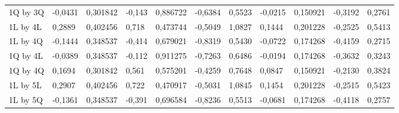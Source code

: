 \begin{table}[H]
{\begin{tabular}{lllllllllll}
\rowcolor[HTML]{FFFFFF} 
1Q by 3Q       & -0,0431                         & 0,301842                        & -0,143                          & 0,886722                        & -0,6384                         & 0,5523                          & -0,0215                         & 0,150921                        & -0,3192                         & 0,2761                          \\
\rowcolor[HTML]{FFFFFF} 
1L by 4L       & 0,2889                          & 0,402456                        & 0,718                           & 0,473744                        & -0,5049                         & 1,0827                          & 0,1444                          & 0,201228                        & -0,2525                         & 0,5413                          \\
\rowcolor[HTML]{FFFFFF} 
1L by 4Q       & -0,1444                         & 0,348537                        & -0,414                          & 0,679021                        & -0,8319                         & 0,5430                          & -0,0722                         & 0,174268                        & -0,4159                         & 0,2715                          \\
\rowcolor[HTML]{FFFFFF} 
1Q by 4L       & -0,0389                         & 0,348537                        & -0,112                          & 0,911275                        & -0,7263                         & 0,6486                          & -0,0194                         & 0,174268                        & -0,3632                         & 0,3243                          \\
\rowcolor[HTML]{FFFFFF} 
1Q by 4Q       & 0,1694                          & 0,301842                        & 0,561                           & 0,575201                        & -0,4259                         & 0,7648                          & 0,0847                          & 0,150921                        & -0,2130                         & 0,3824                          \\
\rowcolor[HTML]{FFFFFF} 
1L by 5L       & 0,2907                          & 0,402456                        & 0,722                           & 0,470917                        & -0,5031                         & 1,0845                          & 0,1454                          & 0,201228                        & -0,2515                         & 0,5423                          \\
\rowcolor[HTML]{FFFFFF} 
1L by 5Q       & -0,1361                         & 0,348537                        & -0,391                          & 0,696584                        & -0,8236                         & 0,5513                          & -0,0681                         & 0,174268                        & -0,4118                         & 0,2757                          \\

\end{tabular}}
\end{table}
